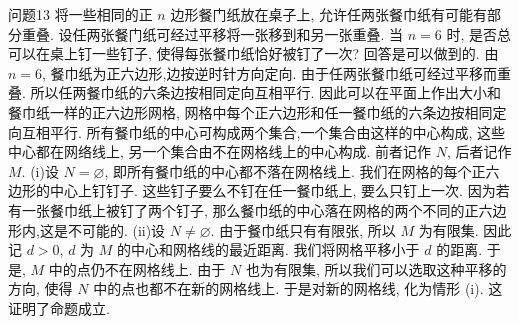 问题13 将一些相同的正 $n$ 边形餐门纸放在桌子上, 允许任两张餐巾纸有可能有部分重叠.
设任两张餐门纸可经过平移将一张移到和另一张重叠.
当 $n=6$ 时, 是否总可以在桌上钉一些钉子, 使得每张餐巾纸恰好被钉了一次?
回答是可以做到的.
由 $n=6$, 餐巾纸为正六边形,边按逆时针方向定向.
由于任两张餐巾纸可经过平移而重叠.
所以任两餐巾纸的六条边按相同定向互相平行.
因此可以在平面上作出大小和餐巾纸一样的正六边形网格, 网格中每个正六边形和任一餐巾纸的六条边按相同定向互相平行.
所有餐巾纸的中心可构成两个集合,一个集合由这样的中心构成, 这些中心都在网络线上, 另一个集合由不在网格线上的中心构成.
前者记作 $N$, 后者记作 $M$.
(i)设 $N=\varnothing$, 即所有餐巾纸的中心都不落在网格线上.
我们在网格的每个正六边形的中心上钉钉子.
这些钉子要么不钉在任一餐巾纸上, 要么只钉上一次.
因为若有一张餐巾纸上被钉了两个钉子, 那么餐巾纸的中心落在网格的两个不同的正六边形内,这是不可能的.
(ii)设 $N \neq \varnothing$. 由于餐巾纸只有有限张, 所以 $M$ 为有限集.
因此记 $d>0$, $d$ 为 $M$ 的中心和网格线的最近距离.
我们将网格平移小于 $d$ 的距离.
于是, $M$ 中的点仍不在网格线上.
由于 $N$ 也为有限集, 所以我们可以选取这种平移的方向, 使得 $N$ 中的点也都不在新的网格线上.
于是对新的网格线, 化为情形 (i). 这证明了命题成立.



